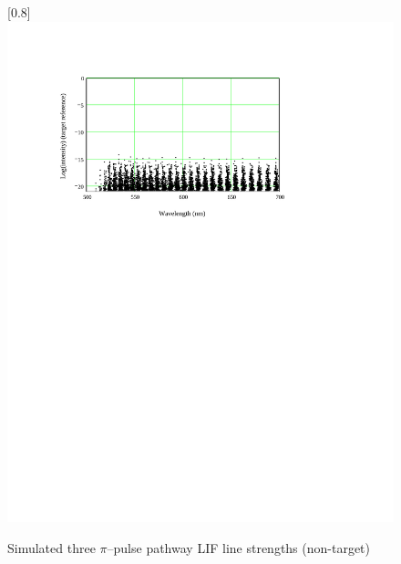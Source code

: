 \begin{figure}
\scalebox{0.8}[0.8]{
\includegraphics[bb=0 480 489 752]
{PI_77/PI_77.pdf}
}
\caption[Simulated three $\pi$--pulse pathway LIF line strengths (non-target)]{Simulated three $\pi$--pulse pathway LIF line strengths (non-target)}
\label{PI_77}
\end{figure}
